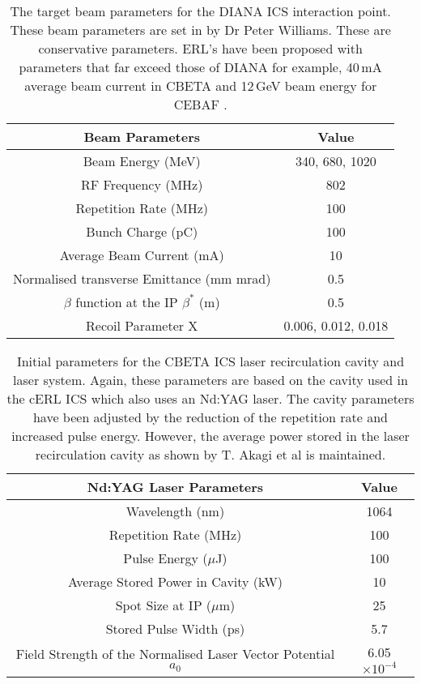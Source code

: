 \documentclass[11pt]{article}
\begin{document}
\begin{table}[H]
\centering
\begin{tabular}{|c||c|}
\hline
\textbf{Beam Parameters} & \textbf{Value} \\
\hline
Beam Energy (MeV) & 340, 680, 1020 \\
\hline
RF Frequency (MHz) & 802 \\
\hline
Repetition Rate (MHz) & 100 \\
\hline
Bunch Charge (pC) & 100 \\
\hline
Average Beam Current (mA) & 10 \\ 
\hline
Normalised transverse Emittance (mm mrad) & 0.5 \\
\hline
$\beta$ function at the IP $\beta^{*}$ (m) & 0.5 \\
\hline
Recoil Parameter X & 0.006, 0.012, 0.018 \\
\hline
\end{tabular}
\caption{\label{tab:DIANAbeam} The target beam parameters for the DIANA ICS interaction point. These beam parameters are set in \cite{PWDIANA} by Dr Peter Williams. These are conservative parameters. ERL's have been proposed with parameters that far exceed those of DIANA for example, 40\,mA average beam current in CBETA \cite{CBETATDR} and 12\,GeV beam energy for CEBAF \cite{CEBAFFMeot}. }
\end{table}

\begin{table}[H]
\centering
\begin{tabular}{|c||c|}
\hline
\textbf{Nd:YAG Laser Parameters} & \textbf{Value} \\
\hline
Wavelength (nm) & 1064 \\
\hline
Repetition Rate (MHz) & 100 \\
\hline
Pulse Energy ($\mu$J) & 100 \\
\hline
Average Stored Power in Cavity (kW) & 10 \\
\hline
Spot Size at IP ($\mu$m) & 25 \\
\hline
Stored Pulse Width (ps) & 5.7 \\
\hline
Field Strength of the Normalised Laser Vector Potential $a_{0}$ & 6.05$\times 10^{-4}$ \\
\hline
\end{tabular}
\caption{\label{tab:DIANAlaser} Initial parameters for the CBETA ICS laser recirculation cavity and laser system. Again, these parameters are based on the cavity used in the cERL ICS \cite{TAkagicERL} which also uses an Nd:YAG laser. The cavity parameters have been adjusted by the reduction of the repetition rate and increased pulse energy. However, the average power stored in the laser recirculation cavity as shown by T. Akagi et al \cite{TAkagicERL} is maintained.}
\end{table}
\end{document}
